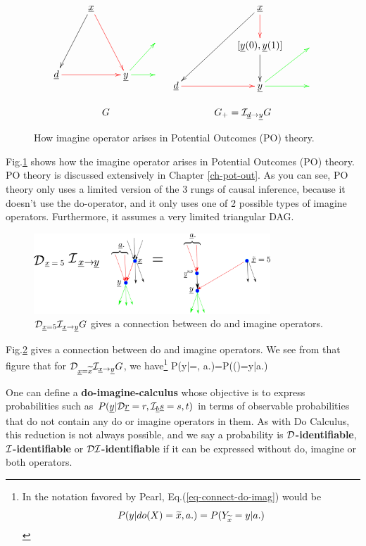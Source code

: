 \begin{figure}[h!]
$$
\begin{array}{ccccc}
\xymatrix{
&\rvx\ar@[red][ddr]\ar[ddl]
\\
&&&
\\
\rvd\ar@[red][rr]
&
&\rvy\ar@[green][r]
\ar@[green][ur]
&
}
&
\xymatrix{
&&\rvx\ar[ddll]\ar@[red][d]
\\
&&[\rvy(0),\rvy(1)]\ar[d]
&
\\
\rvd\ar@[red][rr]
&
&\rvy\ar@[green][r]
\ar@[green][ur]
&
}
\\
\\
G&G_+=\cali_{\rvd\rarrow\rvy}G
\end{array}
$$
\caption{How
 imagine operator
arises in
Potential Outcomes (PO)
theory.
}
\label{fig-counterf-G-im-y0-y1}
\end{figure}
Fig.\ref{fig-counterf-G-im-y0-y1}
shows how the
imagine operator arises
in Potential Outcomes (PO) theory.
PO theory is discussed extensively
in Chapter \ref{ch-pot-out}.
As you can see, PO theory
only uses a limited version
of the 3 rungs
of causal inference, because it
doesn't use the do-operator,
and it only uses one
of 2 possible types of
imagine operators.
Furthermore,
it assumes a
very limited triangular DAG.


\begin{figure}[h!]
\centering
\includegraphics[width=3.5in]
{counterf/rho-kappa.png}
\caption{${\cal D}_{{\underline{x}}=5}{\cal I}_{{\underline{x}}\rightarrow {\underline{y}}}G$
gives a connection
between do and imagine operators.
}
\label{fig-rho-kappa}
\end{figure}

Fig.\ref{fig-rho-kappa}
gives  a connection
between do and imagine
operators.
We see
from that figure that
for ${\cal D}_{{\underline{x}}=\widetilde{x}}
{\cal I}_{{\underline{x}}\rightarrow{\underline{y}}}G$, we have\footnote{In the
notation favored by Pearl, Eq.(\ref{eq-connect-do-imag})
 would be
$$P(y|do(X)=\widetilde{x}, a.)=P(Y_{\widetilde{x}}=y|a.)$$}
\beq
P(y|\cald\rvx=, a.)=P(\rvy()=y|a.)
\label{eq-connect-do-imag}
\eeq


One can define
a {\bf do-imagine-calculus}
whose
objective
is to
express
probabilities such as
$P({\underline{y}}|{\cal D}{\underline{r}}=r,
{\cal I}_{\underline{b}} {\underline{s}}=s, t)$
in terms of observable
probabilities
that do not
contain
any do or imagine
operators in them.
As with
Do Calculus,
this reduction
is not
always possible,
and we say a probability is
{\bf ${\cal D}$-identifiable},
{\bf ${\cal I}$-identifiable}
or
{\bf ${\cal D}{\cal I}$-identifiable}
if it  can be
expressed without do, imagine
or both operators.

